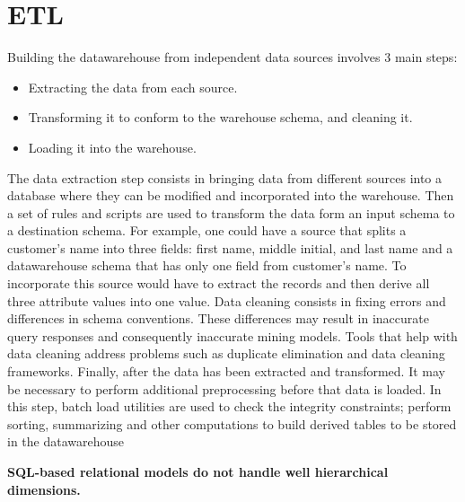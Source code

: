 \documentclass[]{article}
\begin{document}

\section{ETL} %
\label{sec:etl}
Building the datawarehouse from independent data sources involves 3 main steps:
\begin{itemize}
	\item Extracting the data from each source.
	\item Transforming it to conform to the warehouse schema, and cleaning it.
	\item Loading it into the warehouse.
\end{itemize}

The data extraction step consists in bringing data from different sources into a database where they can be modified and incorporated
into the warehouse. Then a set of rules and scripts are used to transform the data form an input schema to a destination schema. For
example, one could have a source that splits a customer's name into three fields: first name, middle initial, and last name and a
datawarehouse schema that has only one field from customer's name. To incorporate this source would have to extract the records and then
derive all three attribute values into one value.
Data cleaning consists in fixing errors and differences in schema conventions. These differences may result in inaccurate query
responses and consequently inaccurate mining models. Tools that help with data cleaning address problems such as duplicate elimination
and data cleaning frameworks.
Finally, after the data has been extracted and transformed. It may be necessary to perform additional preprocessing before that data is
loaded. In this step, batch load utilities are used to check the integrity constraints; perform sorting, summarizing and other
computations to build derived tables to be stored in the datawarehouse



	

\textbf{SQL-based
relational models do not handle well hierarchical dimensions.}




\end{document}

